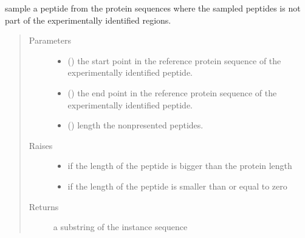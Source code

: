 \documentclass[letterpaper,10pt,english]{sphinxmanual}
\begin{document}
\begin{fulllineitems}
\begin{fulllineitems}
\label{\detokenize{IPTK.Classes:IPTK.Classes.Protein.Protein.get_non_presented_peptide}}
sample a peptide from the protein sequences where the sampled peptides is not part of the               experimentally identified regions.
\begin{quote}\begin{description}
\item[{Parameters}] \leavevmode\begin{itemize}
\item {} 
 () \textendash{} the start point in the reference protein sequence of the experimentally identified peptide.

\item {} 
 () \textendash{} the end point in the reference protein sequence of the experimentally identified peptide.

\item {} 
 () \textendash{} length the non\sphinxhyphen{}presented peptides.

\end{itemize}

\item[{Raises}] \leavevmode\begin{itemize}
\item {} 
 \textendash{} if the length of the peptide is bigger than the protein length

\item {} 
 \textendash{} if the length of the peptide is smaller than or equal to zero

\end{itemize}

\item[{Returns}] \leavevmode
a substring of the instance sequence


\end{description}
\end{quote}
\end{fulllineitems}
\end{fulllineitems}
\end{document}

